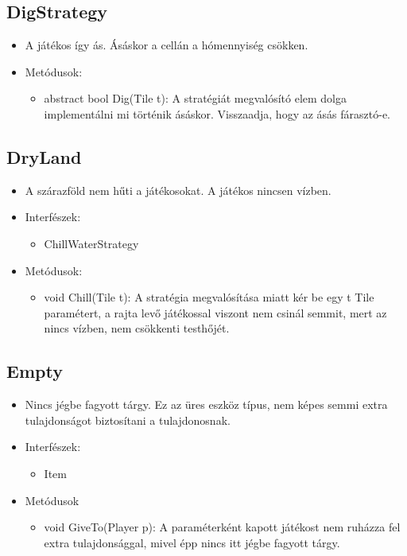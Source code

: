 \subsection{DigStrategy}
\begin{itemize}
	\item A játékos így ás.	Ásáskor a cellán a hómennyiség csökken.
	\item Metódusok:
	\begin{itemize}
		\item abstract bool Dig(Tile t): A stratégiát megvalósító elem dolga implementálni mi történik ásáskor. Visszaadja, hogy az ásás fárasztó-e.
	\end{itemize}
\end{itemize}

\subsection{DryLand}
\begin{itemize}
	\item A szárazföld nem hűti a játékosokat. A játékos nincsen vízben.
	\item Interfészek:
	\begin{itemize}
		\item ChillWaterStrategy
	\end{itemize}
	\item Metódusok:
	\begin{itemize}
		\item void Chill(Tile t): A stratégia megvalósítása miatt kér be egy t Tile paramétert, a rajta levő játékossal viszont nem csinál semmit, mert az nincs vízben, nem csökkenti testhőjét.
	\end{itemize}
\end{itemize}

\subsection{Empty}
\begin{itemize}
	\item Nincs jégbe fagyott tárgy. Ez az üres eszköz típus, nem képes semmi extra tulajdonságot biztosítani a tulajdonosnak.
	\item Interfészek:
	\begin{itemize}
		\item Item
	\end{itemize}
	\item Metódusok
	\begin{itemize}
		\item void GiveTo(Player p): A paraméterként kapott játékost nem ruházza fel extra tulajdonsággal, mivel épp nincs itt jégbe fagyott tárgy.
	\end{itemize}
\end{itemize}

